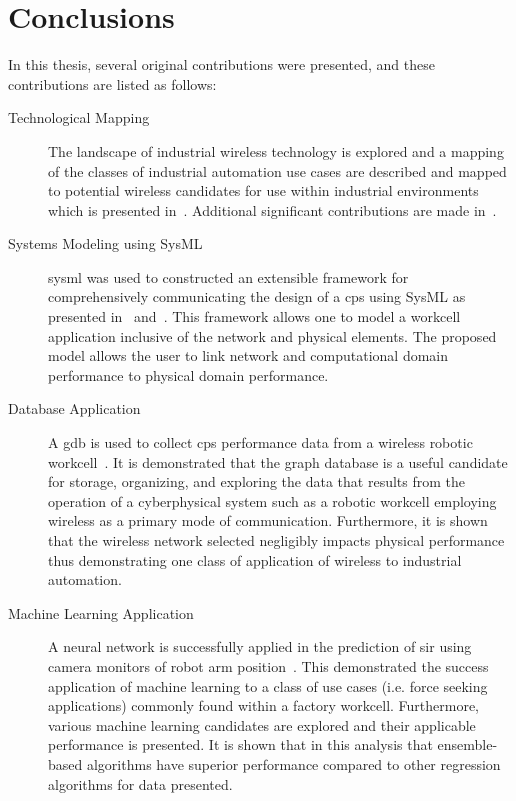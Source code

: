 
\chapter{Conclusions}

In this thesis, several original contributions were presented, and these contributions are listed as follows:

\begin{description}
	\item[Technological Mapping] The landscape of industrial wireless technology is explored and a mapping of the classes of industrial automation use cases are described and mapped to potential wireless candidates for use within industrial environments which is presented in~\cite{CandellRW2017}.  Additional significant contributions are made in~\cite{Candell2018.IWSGuide, Candell2017.SAS.IWSWorkshopReport, Montgomery2019}.
	
	\item[Systems Modeling using SysML] \Gls{sysml} was used to constructed an extensible framework for comprehensively communicating the design of a \gls{cps} using SysML as presented in~\cite{Candell2019ASR.SYSML} and~\cite{Candell2018SysML.DATA}.  This framework allows one to model a workcell application inclusive of the network and physical elements.  The proposed model allows the user to link network and computational domain performance to physical domain performance.
	
	\item[Database Application] A \gls{gdb} is used to collect \gls{cps} performance data from a wireless robotic workcell~\cite{CandellISIT2020.Conf}.  It is demonstrated that the graph database is a useful candidate for storage, organizing, and exploring the data that results from the operation of a cyberphysical system such as a robotic workcell employing wireless as a primary mode of communication.  Furthermore, it is shown that the wireless network selected negligibly impacts physical performance thus demonstrating one class of application of wireless to industrial automation.
	
	\item[Machine Learning Application] A neural network is successfully applied in the prediction of \gls{sir} using camera monitors of robot arm position~\cite{CandellISIE2019.Conf, Candell2020.Jrnl.ISATrans}.  This demonstrated the success application of machine learning to a class of use cases (i.e. force seeking applications) commonly found within a factory workcell.  Furthermore, various machine learning candidates are explored and their applicable performance is presented.  It is shown that in this analysis that ensemble-based algorithms have superior performance compared to other regression algorithms for data presented.  
\end{description}

